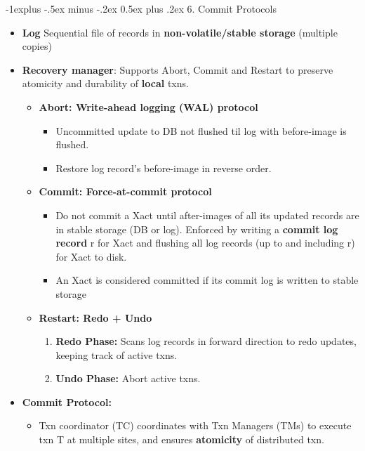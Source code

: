 \documentclass[8pt, landscape]{extarticle}
\makeatletter
\renewcommand{\subsection}{\@startsection{subsection}{2}{0mm}%
  {-1explus -.5ex minus -.2ex}%
  {0.5ex plus .2ex}%
{\normalfont\normalsize\bfseries}}
\makeatother
\begin{document}
\begin{multicols*}{4}
  \subsection{6. Commit Protocols}
\begin{itemize}
    \item \textbf{Log} Sequential file of records in \textbf{non-volatile/stable storage} (multiple copies)
    \item \textbf{Recovery manager}: Supports Abort, Commit and Restart to preserve atomicity and durability of \textbf{local} txns.
    \begin{itemize}
        \item \textbf{Abort: Write-ahead logging (WAL) protocol}
        \begin{itemize}
            \item Uncommitted update to DB not flushed til log with before-image is flushed.
            \item Restore log record's before-image in reverse order.
        \end{itemize}
        \item \textbf{Commit: Force-at-commit protocol}
        \begin{itemize}
            \item Do not commit a Xact until after-images of all its updated records are in stable storage (DB or log). Enforced by writing a \textbf{commit log record} r for Xact and flushing all log records (up to and including r) for Xact to disk.
            \item An Xact is considered committed if its commit log is written to stable storage
        \end{itemize}
        \item \textbf{Restart: Redo + Undo}
        \begin{enumerate}
            \item \textbf{Redo Phase:} Scans log records in forward direction to redo updates, keeping track of active txns.
            \item \textbf{Undo Phase:} Abort active txns.
        \end{enumerate}
    \end{itemize}
    \item \textbf{Commit Protocol:}
    \begin{itemize}
        \item Txn coordinator (TC) coordinates with Txn Managers (TMs) to execute txn T at multiple sites, and ensures \textbf{atomicity} of distributed txn.

\end{itemize}
\end{itemize}
\end{multicols*}
\end{document}

